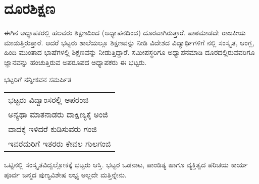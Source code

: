 {\section*{ದೂರಶಿಕ್ಷಣ} 
\vskip -4pt

ಈಗಿನ ಅಧ್ಯಾಪಕರಲ್ಲಿ ಹಲವರು ಶಿಕ್ಷಣದಿಂದ (ಅಧ್ಯಾಪನದಿಂದ) ದೂರವಾಗಿರುತ್ತಾರೆ.  ಪಾಠಮಾಡದೇ ರಾಜಕೀಯ ಮಾಡುತ್ತಿರುತ್ತಾರೆ.  ಆದರೆ ಭಟ್ಟರು ಶಾಲೆಯಲ್ಲೂ ಶಿಕ್ಷಣ\-ವನ್ನು ನೀಡಿ ವಿದೇಶದ ವಿದ್ಯಾರ್ಥಿಗಳಿಗೆ   ನಲ್ಲಿ ಸಂಸ್ಕೃತ, ಆಂಗ್ಲ, ಹಿಂದಿ ಮುಂತಾದ ಭಾಷೆಗಳಲ್ಲಿ ಶಿಕ್ಷಣವನ್ನು ನೀಡುತ್ತಿದ್ದಾರೆ. ಸಮೀಪಸ್ಥರಿಗೂ ಅಧ್ಯಾಪನಮಾಡಿ ದೂರದಲ್ಲಿರುವವರಿಗೂ ಜ್ಞಾನವನ್ನು ಹಂಚುತ್ತಿರುವ ಅಪರೂಪದ ಅಧ್ಯಾಪಕರು ಈ ಭಟ್ಟರು.

ಭಟ್ಟರಿಗೆ ನನ್ನೀಕವನ ಸಮರ್ಪಿತ   \enginline{-}  

\begin{tabular}{>{\hspace{0.8cm}}l}
ಭಟ್ಟರು ವಿದ್ವಾಂಸರಲ್ಲಿ ಅಪರಂಜಿ\\
ಅನ್ಯಥಾ ಮಾತನಾಡರು ದಾಕ್ಷಿಣ್ಯಕ್ಕೆ ಅಂಜಿ\\
ವಾದಕ್ಕೆ ಇಳಿದರೆ ಕುಡಿಸುವರು ಗಂಜಿ\\
ಇವರೆದುರಿಗೆ ಇತರರು ಕೇವಲ ಗುಲಗಂಜಿ
\end{tabular}

ಒಟ್ಟಿನಲ್ಲಿ ಸಂಸ್ಕೃತವಿದ್ವಲ್ಲೋಕಕ್ಕೆ ಭಟ್ಟರು ಆಸ್ತಿ. ಭಟ್ಟರ ಒಡನಾಟ, ಪಾಂಡಿತ್ಯ ಹಾಗೂ ವ್ಯಕ್ತಿತ್ವದ ಪರಿಚಯ ಕಾರ್ಯ ಪೂರ್ವ ಜನ್ಮದ  ಪುಣ್ಯವಿಶೇಷ ಲಭ್ಯ ಅಲ್ಲದೇ ಮತ್ತಿನ್ನೇನು. 
\vskip -15pt

\centerline{{\fontsize{8}{10}\selectfont{}\quad{}\quad{}}}
}
